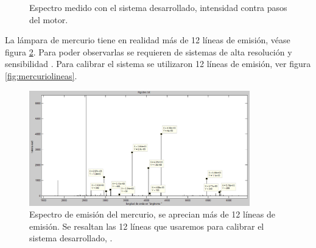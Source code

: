 \begin{figure}[h]
	\centering
	
	\caption{Espectro medido con el sistema desarrollado, intensidad contra pasos del motor.}
	\label{fig:hg-04-m99-50pps}
\end{figure}

La lámpara de mercurio tiene en realidad más de 12 líneas de emisión, véase figura \ref{fig:emisionhglibro}. Para poder observarlas se requieren de sistemas de alta resolución y sensibilidad \cite{CRC2016}. Para calibrar el sistema se utilizaron 12 líneas de emisión, ver figura \ref{fig:mercuriolineas}.
\begin{figure}
	\centering
	\includegraphics[width=0.9\linewidth,height=5cm]{Imagenes/3/emisionHgLibro}
	\caption{Espectro de emisión del mercurio, se aprecian más de 12 líneas de emisión. Se resaltan las 12 líneas que usaremos para calibrar el sistema desarrollado, \cite{CRC2016}.}
	\label{fig:emisionhglibro}
\end{figure}


